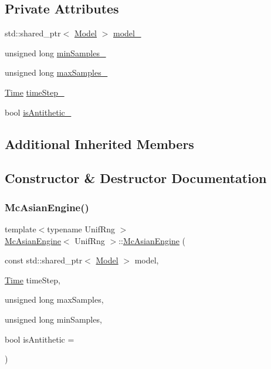 \subsection*{Private Attributes}
\begin{DoxyCompactItemize}
\item 
std\+::shared\+\_\+ptr$<$ \hyperlink{class_model}{Model} $>$ \hyperlink{class_mc_asian_engine_a3b8579245987fd1a2f98561fee7e7011}{model\+\_\+}
\item 
unsigned long \hyperlink{class_mc_asian_engine_ad310118988d49cf73b5515ee6af85996}{min\+Samples\+\_\+}
\item 
unsigned long \hyperlink{class_mc_asian_engine_afef8e1a62d6d3e865a511f9b24bc16fe}{max\+Samples\+\_\+}
\item 
\hyperlink{_name_def_8h_ac2d3e0ba793497bcca555c7c2cf64ff3}{Time} \hyperlink{class_mc_asian_engine_a44bf438e294ec6b6475e85412422ec54}{time\+Step\+\_\+}
\item 
bool \hyperlink{class_mc_asian_engine_adbc09c299d05335c926179154fd52eca}{is\+Antithetic\+\_\+}
\end{DoxyCompactItemize}
\subsection*{Additional Inherited Members}


\subsection{Constructor \& Destructor Documentation}
\hypertarget{class_mc_asian_engine_a8688d15638d6176095dab92ef31ad3ad}{}\label{class_mc_asian_engine_a8688d15638d6176095dab92ef31ad3ad} 
\subsubsection{\texorpdfstring{Mc\+Asian\+Engine()}{McAsianEngine()}}
{\footnotesize\ttfamily template$<$typename Unif\+Rng $>$ \\
\hyperlink{class_mc_asian_engine}{Mc\+Asian\+Engine}$<$ Unif\+Rng $>$\+::\hyperlink{class_mc_asian_engine}{Mc\+Asian\+Engine} (\begin{DoxyParamCaption}\item[{const std\+::shared\+\_\+ptr$<$ \hyperlink{class_model}{Model} $>$}]{model,  }\item[{\hyperlink{_name_def_8h_ac2d3e0ba793497bcca555c7c2cf64ff3}{Time}}]{time\+Step,  }\item[{unsigned long}]{max\+Samples,  }\item[{unsigned long}]{min\+Samples,  }\item[{bool}]{is\+Antithetic = {} }\end{DoxyParamCaption})}



